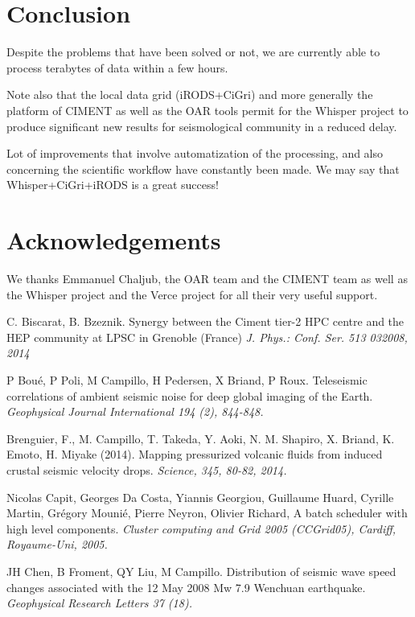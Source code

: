 \documentclass[a4paper, 10pt]{article}
\begin{document}
\begin{multicols}{2}
\section{Conclusion}

Despite the problems that have been solved or not, we are currently able to process terabytes of data within a few hours.

Note also that the local data grid (iRODS+CiGri) and more generally the platform of CIMENT as well as the OAR tools permit for the Whisper project  to produce significant new results for seismological community in a reduced delay.

Lot of improvements that involve automatization of the processing, and also concerning the scientific workflow have constantly been made.
We may say that Whisper+CiGri+iRODS is a great success!

\section{Acknowledgements}
We thanks Emmanuel Chaljub, the OAR team and the CIMENT team as well as the Whisper project and the Verce project for all their very useful support.


\begin{thebibliography}{9}

C. Biscarat, B. Bzeznik.
Synergy between the Ciment tier-2 HPC centre and the HEP community at LPSC in Grenoble (France)
{\em J. Phys.: Conf. Ser. 513 032008, 2014}
    
P Bou\'e, P Poli, M Campillo, H Pedersen, X Briand, P Roux.
Teleseismic correlations of ambient seismic noise for deep global imaging of the Earth.
{\em Geophysical Journal International 194 (2), 844-848.}

Brenguier, F., M. Campillo, T. Takeda, Y. Aoki, N. M. Shapiro, X. Briand, K. Emoto, H. Miyake (2014).
Mapping pressurized volcanic fluids from induced crustal seismic velocity drops.
{\em Science, 345, 80-82, 2014.}

Nicolas Capit, Georges Da Costa, Yiannis Georgiou, Guillaume Huard, Cyrille Martin, Gr\'egory Mouni\'e, Pierre Neyron, Olivier Richard,
A batch scheduler with high level components.
{\em Cluster computing and Grid 2005 (CCGrid05), Cardiff, Royaume-Uni, 2005.}

JH Chen, B Froment, QY Liu, M Campillo.
Distribution of seismic wave speed changes associated with the 12 May 2008 Mw 7.9 Wenchuan earthquake.
{\em Geophysical Research Letters 37 (18).}


\end{thebibliography}
\end{multicols}
\end{document}
